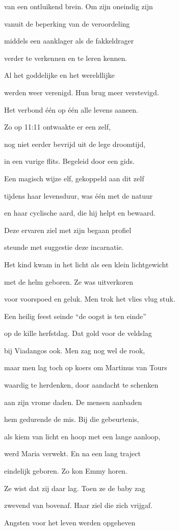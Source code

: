 van een ontluikend brein.
Om zijn oneindig zijn

vanuit de beperking
van de veroordeling

middels een aanklager
als de fakkeldrager

verder te verkennen
en te leren kennen.

Al het goddelijke
en het wereldlijke

werden weer verenigd.
Hun brug meer verstevigd.

Het verbond één op één
alle levens aaneen.

Zo op 11:11
ontwaakte er een zelf,

nog niet eerder bevrijd
uit de lege droomtijd,

in een vurige flits.
Begeleid door een gids.

Een magisch wijze elf,
gekoppeld aan dit zelf

tijdens haar levensduur,
was één met de natuur

en haar cyclische aard,
die hij helpt en bewaard.

Deze ervaren ziel
met zijn begaan profiel

steunde met suggestie
deze incarnatie.

Het kind kwam in het licht
als een klein lichtgewicht

met de helm geboren.
Ze was uitverkoren

voor voorspoed en geluk.
Men trok het vlies vlug stuk.

Een heilig feest seinde
“de oogst is ten einde”

op de kille herfstdag.
Dat gold voor de veldslag

bij Viadangos ook.
Men zag nog wel de rook,

maar men lag toch op koers
om Martinus van Tours

waardig te herdenken,
door aandacht te schenken

aan zijn vrome daden.
De mensen aanbaden

hem gedurende de mis.
Bij die gebeurtenis,

als kiem van licht en hoop
met een lange aanloop,

werd Maria verwekt.
En na een lang traject

eindelijk geboren.
Zo kon Emmy horen.

Ze wist dat zij daar lag.
Toen ze de baby zag

zwevend van bovenaf.
Haar ziel die zich vrijgaf.

Angsten voor het leven
werden opgeheven

